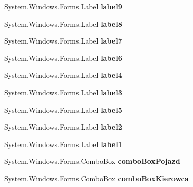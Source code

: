 \begin{DoxyCompactItemize}
System.\+Windows.\+Forms.\+Label {\bfseries label9}
\item 
\mbox{\label{class_statystyki___o_s_p_1_1_accident_form_ae8ed61ec98a9d7b87b2f6be907c6f11b}} 
System.\+Windows.\+Forms.\+Label {\bfseries label8}
\item 
\mbox{\label{class_statystyki___o_s_p_1_1_accident_form_aac6ae7671bc1152bdf23b66582744642}} 
System.\+Windows.\+Forms.\+Label {\bfseries label7}
\item 
\mbox{\label{class_statystyki___o_s_p_1_1_accident_form_a95732bc6013339fa4dcb5d11f14c1cd3}} 
System.\+Windows.\+Forms.\+Label {\bfseries label6}
\item 
\mbox{\label{class_statystyki___o_s_p_1_1_accident_form_a9859b6f74adddf3fba5f48ca7513259d}} 
System.\+Windows.\+Forms.\+Label {\bfseries label4}
\item 
\mbox{\label{class_statystyki___o_s_p_1_1_accident_form_a03b7f02becf40abd712f641925e009c4}} 
System.\+Windows.\+Forms.\+Label {\bfseries label3}
\item 
\mbox{\label{class_statystyki___o_s_p_1_1_accident_form_ad7775362a6c04414eb66b4518fd08226}} 
System.\+Windows.\+Forms.\+Label {\bfseries label5}
\item 
\mbox{\label{class_statystyki___o_s_p_1_1_accident_form_a59a760eaf8e7ca48841ccd3b963c7ad9}} 
System.\+Windows.\+Forms.\+Label {\bfseries label2}
\item 
\mbox{\label{class_statystyki___o_s_p_1_1_accident_form_ab89ddcf430a20d5127aed0d8570cd290}} 
System.\+Windows.\+Forms.\+Label {\bfseries label1}
\item 
\mbox{\label{class_statystyki___o_s_p_1_1_accident_form_abf0455ce962352c4e68de8dfce1a34ff}} 
System.\+Windows.\+Forms.\+Combo\+Box {\bfseries combo\+Box\+Pojazd}
\item 
\mbox{\label{class_statystyki___o_s_p_1_1_accident_form_af0285b8d50c134d5ccf43208a8f9f5a8}} 
System.\+Windows.\+Forms.\+Combo\+Box {\bfseries combo\+Box\+Kierowca}
\end{DoxyCompactItemize}


